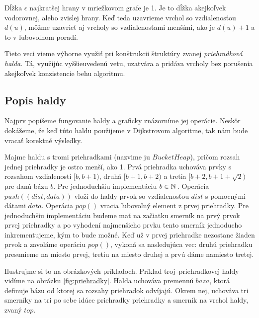 \begin{example}
\label{ex:range}
Dĺžka $\epsilon$ najkratšej hrany v mriežkovom grafe je 1. Je to dĺžka akejkoľvek vodorovnej, alebo zvislej hrany.
Keď teda uzavrieme vrchol so vzdialenosťou $d(u)$, môžme uzavrieť aj vrcholy so vzdialenosťami menšími, ako je $d(u) + 1$ a to v ľubovoľnom poradí.
\end{example}

Tieto veci vieme výborne využiť pri konštrukcii štruktúry
zvanej {\sl priehradková halda}. Tá, využijúc vyššieuvedenú vetu, uzatvára a pridáva vrcholy bez porušenia akejkoľvek konzistencie behu algoritmu.

\subsection{Popis haldy}
Najprv popíšeme fungovanie haldy a graficky znázorníme jej 
operácie. Neskôr dokážeme, že keď túto haldu použijeme v Dijkstrovom algoritme, tak nám bude vracať korektné výsledky.

Majme haldu s tromi priehradkami (nazvime ju $BucketHeap$), pričom rozsah jednej priehradky je ostro menší, ako 1.
Prvá priehradka uchováva prvky s rozsahom vzdialeností $ [b, b+1) $, druhá $ [b+1, b+2) $ a tretia $ [b+2, b+1+\sqrt{2}) $
pre danú bázu $ b $. Pre jednoduchšiu implementáciu $b \in \mathbb{N}\,$. Operácia $push((dist, data))$ vloží do haldy prvok so vzdialenosťou $dist$ 
s pomocnými dátami $data$. Operácia $pop()$ vracia ľubovoľný element z prvej priehradky. 
Pre jednoduchšiu implementáciu budeme mať na začiatku smerník na prvý prvok prvej priehradky a po vyhodení najmenšieho prvku tento smerník jednoducho inkrementujeme, kým to bude možné. Keď už v prvej priehradke nezostane žiaden prvok a zavoláme operáciu $pop()$, vykoná sa nasledujúca vec: druhú priehradku presunieme na miesto prvej, tretiu na miesto druhej a prvú dáme namiesto tretej.

Ilustrujme si to na obrázkových príkladoch. Príklad troj--priehradkovej haldy vidíme na obrázku \ref{fig:priehradky}.
Halda uchováva premennú $ baza $, ktorá definuje bázu od ktorej sa rozsahy priehradok odvíjajú. Okrem
nej, uchováva tri smerníky na tri po sebe idúce priehradky priehradky a smerník na vrchol haldy, zvaný $ top $.



